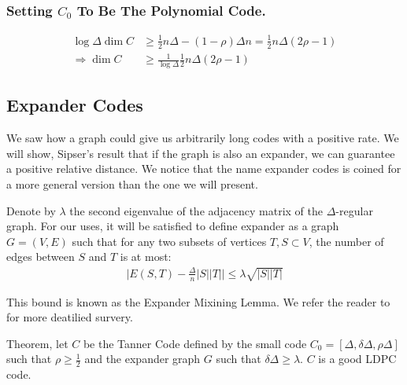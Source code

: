   \subsubsection{Setting $C_{0}$ To Be The Polynomial Code.}
  
  \begin{equation*}
    \begin{split}
     \log \Delta \dim C & \ge \frac{1}{2}n\Delta  - \left( 1- \rho  \right) \Delta n = \frac{1}{2}n\Delta\left( 2\rho - 1 \right)  \\
     \Rightarrow  \dim C & \ge \frac{1}{\log \Delta} \frac{1}{2}n\Delta\left( 2\rho - 1 \right)  
    \end{split}
  \end{equation*}
  \subsection{Expander Codes}
  We saw how a graph could give us arbitrarily long codes with a positive rate. We will show, Sipser's result that if the graph is also an expander, we can guarantee a positive relative distance. We notice that the name expander codes is coined for a more general version than the one we will present.   
  \begin{definition} Denote by $\lambda$ the second eigenvalue of the adjacency matrix of the $\Delta$-regular graph. For our uses, it will be satisfied to define expander as a graph $G = \left( V,E \right)$ such that for any two subsets of vertices $T,S \subset V$, the number of edges between $S$ and $T$ is at most:
  \begin{equation*}
    \begin{split}
      \mid E\left( S,T \right) - \frac{\Delta}{n}|S||T| \mid \le \lambda\sqrt{|S| |T|} 
    \end{split}
  \end{equation*}
\end{definition}
This bound is known as the Expander Mixining Lemma. We refer the reader to \cite{hoory2006expander} for more deatilied survery. 
  \begin{theorem*} Theorem, let $C$ be the Tanner Code defined by the small code $C_{0} = [\Delta,\delta\Delta, \rho\Delta ]$ such that $\rho \ge \frac{1}{2}$ and the expander graph $G$ such that $\delta\Delta \ge \lambda$. $C$ is a good  LDPC code.
  \end{theorem*}
